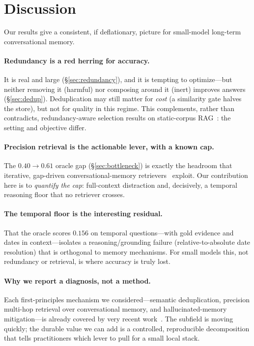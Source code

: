 \section{Discussion}
\label{sec:discussion}

Our results give a consistent, if deflationary, picture for small-model
long-term conversational memory.

\paragraph{Redundancy is a red herring for accuracy.} It is real and large
(\S\ref{sec:redundancy}), and it is tempting to optimize---but neither removing
it (harmful) nor composing around it (inert) improves answers
(\S\ref{sec:dedup}). Deduplication may still matter for \emph{cost} (a similarity
gate halves the store), but not for quality in this regime. This complements,
rather than contradicts, redundancy-aware selection results on static-corpus
RAG~\cite{peng2025adagres}: the setting and objective differ.

\paragraph{Precision retrieval is the actionable lever, with a known cap.} The
$0.40\!\to\!0.61$ oracle gap (\S\ref{sec:bottleneck}) is exactly the headroom
that iterative, gap-driven conversational-memory
retrievers~\cite{li2026evimem,ji2026mragent} exploit. Our contribution here is to
\emph{quantify the cap}: full-context distraction and, decisively, a temporal
reasoning floor that no retriever crosses.

\paragraph{The temporal floor is the interesting residual.} That the oracle
scores $0.156$ on temporal questions---with gold evidence and dates in
context---isolates a reasoning/grounding failure (relative-to-absolute date
resolution) that is orthogonal to memory mechanisms. For small models this,
not redundancy or retrieval, is where accuracy is truly lost.

\paragraph{Why we report a diagnosis, not a method.} Each first-principles
mechanism we considered---semantic deduplication, precision multi-hop retrieval
over conversational memory, and hallucinated-memory mitigation---is already
covered by very recent work~\cite{peng2025adagres,li2026evimem,ji2026mragent,chen2025halumem}.
The subfield is moving quickly; the durable value we can add is a controlled,
reproducible decomposition that tells practitioners which lever to pull for a
small local stack.
